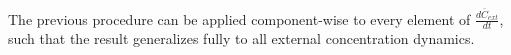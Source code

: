 The previous procedure can be applied component-wise to every element of $\frac{d\overline{C}_{ext}}{dt}$, such that the result generalizes fully to all external concentration dynamics.\\ %

